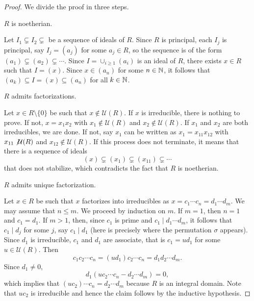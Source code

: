 \begin{proof}
	We divide the proof in three steps. 
	\begin{claim}
		$R$ is noetherian. 	
	\end{claim}
	
	Let $I_1\subsetneq I_2\subsetneq$ be a sequence of ideals of $R$.  
	Since $R$ is principal, each $I_j$ is principal, 
	say $I_j=(a_j)$ for some $a_j\in R$, so the sequence is of the form
	$(a_1)\subsetneq (a_2)\subsetneq\cdots$. Since $I=\cup_{i\geq1}(a_i)$ is an ideal of $R$, 
	there exists $x\in R$ such that $I=(x)$. Since $x\in (a_n)$ for some $n\in\mathbb{N}$, 
	it follows that $(a_k)\subseteq I=(x)\subseteq (a_n)$ for all $k\in\mathbb{N}$. 
	
	\begin{claim}
		$R$ admits factorizations. 	
	\end{claim}
	
	Let $x\in R\setminus\{0\}$ be such that $x\not\in\mathcal{U}(R)$. If $x$ is irreducible, 
	there is nothing to prove. If not, $x=x_1x_2$ with $x_1\not\in\mathcal{U}(R)$ and
	$x_2\not\in\mathcal{U}(R)$. If $x_1$ and $x_2$ are both irreducibles, 
	we are done. If not, say $x_1$ can be written as $x_1=x_{11}x_{12}$ with
	$x_{11}\not\mathcal{U}(R)$ and $x_{12}\not\in\mathcal{U}(R)$. If this process
	does not terminate, it means that there is a sequence of ideals
	\[
	(x)\subsetneq (x_1)\subsetneq (x_{11})\subsetneq\cdots 
	\]
	that does not stabilize, which contradicts the fact that $R$ is noetherian.  
	
	\begin{claim}
		$R$ admits unique factorization.	
	\end{claim}
	
	Let $x\in R$ be such that $x$ factorizes into irreducibles as 
	$x=c_1\cdots c_n=d_1\cdots d_m$. We may assume that $n\leq m$. We proceed by 
	induction on $m$. If $m=1$, then 
	$n=1$ and $c_1=d_1$. If $m>1$, then, since $c_1$ is prime and 
	$c_1\mid d_1\cdots d_m$, it follows that $c_1\mid d_j$ for some $j$, say $c_1\mid d_1$ (here is precisely where the permutation $\sigma$ appears). Since
	$d_1$ is irreducible, $c_1$ and $d_1$ are associate, that is
	$c_1=ud_1$ for some $u\in\mathcal{U}(R)$. Then
	\[
	c_1c_2\cdots c_n=(ud_1)c_2\cdots c_n=d_1d_2\cdots d_m. 
	\]
	Since $d_1\ne 0$,  
	\[
	d_1(uc_2\cdots c_n-d_2\cdots d_m)=0,
	\]
	which implies that $(uc_2)\cdots c_n=d_2\cdots d_m$ because $R$ is an integral domain. Note
	that $uc_2$ is irreducible and hence 
	the claim follows by the inductive hypothesis. 
\end{proof}

